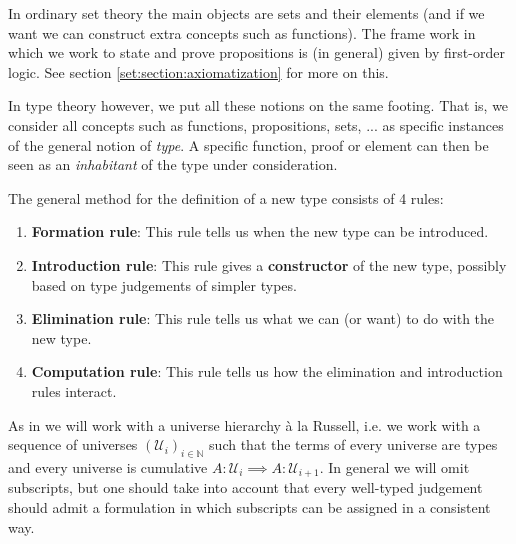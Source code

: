     In ordinary set theory the main objects are sets and their elements (and if we want we can construct extra concepts such as functions). The frame work in which we work to state and prove propositions is (in general) given by first-order logic. See section \ref{set:section:axiomatization} for more on this.

    In type theory however, we put all these notions on the same footing. That is, we consider all concepts such as functions, propositions, sets, ... as specific instances of the general notion of \textit{type}. A specific function, proof or element can then be seen as an \textit{inhabitant} of the type under consideration.

    \begin{method}
        The general method for the definition of a new type consists of 4 rules:
        \begin{enumerate}
            \item \textbf{Formation rule}: This rule tells us when the new type can be introduced.
            \item \textbf{Introduction rule}: This rule gives a \textbf{constructor} of the new type, possibly based on type judgements of simpler types.
            \item \textbf{Elimination rule}: This rule tells us what we can (or want) to do with the new type.
            \item \textbf{Computation rule}: This rule tells us how the elimination and introduction rules interact.
        \end{enumerate}
    \end{method}

    As in \cite{hott} we will work with a universe hierarchy \`a la Russell, i.e. we work with a sequence of universes $(\mathcal{U}_i)_{i\in\mathbb{N}}$ such that the terms of every universe are types and every universe is cumulative $A:\mathcal{U}_i\implies A:\mathcal{U}_{i+1}$. In general we will omit subscripts, but one should take into account that every well-typed judgement should admit a formulation in which subscripts can be assigned in a consistent way.

